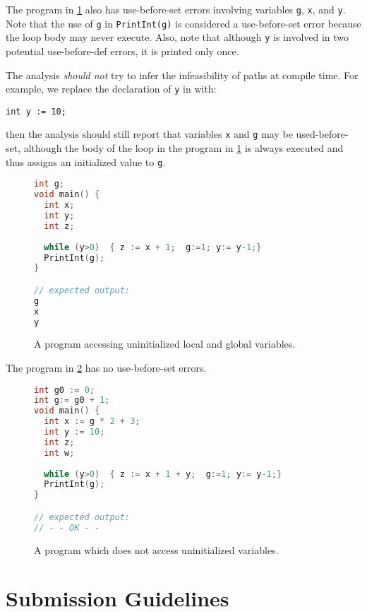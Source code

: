 \documentclass{article}
\begin{document}
The program in \cref{fig:example-loop} also has use-before-set errors involving variables \texttt{g}, \texttt{x}, and \texttt{y}.
Note that the use of \texttt{g} in \texttt{PrintInt(g)} is considered a use-before-set error because the loop body may never execute.
Also, note that although \texttt{y} is involved in two potential use-before-def errors, it is printed only once.

The analysis \emph{should not} try to infer the infeasibility of paths at compile time.
For example, we replace the declaration of \texttt{y} in  with:
\begin{lstlisting}
int y := 10;
\end{lstlisting}
then the analysis should still report that variables \texttt{x} and \texttt{g} may be used-before-set,
although the body of the loop in the program in \cref{fig:example-loop} is always executed and thus assigns an initialized value to \texttt{g}.

\begin{figure}
\centering
\begin{lstlisting}[language=C]
int g;
void main() {
  int x;
  int y;
  int z;
  
  while (y>0)  { z := x + 1;  g:=1; y:= y-1;}
  PrintInt(g);
}

// expected output:
g
x
y
\end{lstlisting}
\caption{A program accessing uninitialized local and global variables.}
\label{fig:example-loop}
\end{figure} 

The program in \cref{fig:example-ok}  has no use-before-set errors. 

\begin{figure}
\centering
\begin{lstlisting}[language=C]
int g0 := 0;
int g:= g0 + 1;
void main() {
  int x := g * 2 + 3;
  int y := 10;
  int z;
  int w;
  
  while (y>0)  { z := x + 1 + y;  g:=1; y:= y-1;}
  PrintInt(g);
}

// expected output:
// - - OK - -
\end{lstlisting}
\caption{A program which does not access uninitialized variables.}
\label{fig:example-ok}
\end{figure} 

\section{Submission Guidelines}
 
\end{document}

